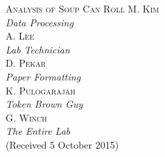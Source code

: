 \documentclass[12pt,notitlepage,twoside]{article}
\begin{document}
  


\thispagestyle{empty}

\begin{center}
\huge
\textsc{Analysis of Soup Can Roll}
{\large\centering
\newline
\newline
\textsc{M. Kim\\}
\textit{\footnotesize Data Processing\\}
\large
\textsc{A. Lee\\}
\textit{\footnotesize Lab Technician\\}
\large
\textsc{D. Pekar\\}
\textit{\footnotesize Paper Formatting\\}
\large
\textsc{K. Pulogarajah\\}
\textit{\footnotesize Token Brown Guy\\}
\large
\textsc{G. Winch\\}
\textit{\footnotesize The Entire Lab\\}
\vspace{3mm}
\footnotesize
(Received 5 October 2015)\\}
\end{center}
\end{document}
